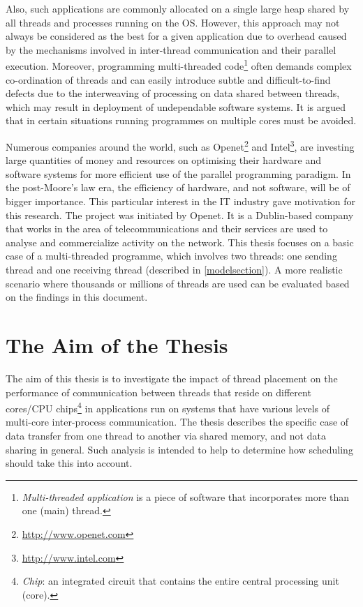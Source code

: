Also, such applications are commonly allocated on a single large heap shared by all threads and processes running on the OS. However, this approach may not always be considered as the best for a given application due to overhead caused by the mechanisms involved in inter-thread communication and their parallel execution. Moreover, programming multi-threaded code\footnote{\textit{Multi-threaded application} is a piece of software that incorporates more than one (main) thread.} often demands complex co-ordination of threads and can easily introduce subtle and difficult-to-find defects due to the interweaving of processing on data shared between threads, which may result in deployment of undependable software systems. It is argued that in certain situations running programmes on multiple cores must be avoided.

Numerous companies around the world, such as Openet\footnote{\url{http://www.openet.com}} and Intel\footnote{\url{http://www.intel.com}}, are investing large quantities of money and resources on optimising their hardware and software systems for more efficient use of the parallel programming paradigm. In the post-Moore's law era, the efficiency of hardware, and not software, will be of bigger importance. This particular interest in the IT industry gave motivation for this research. The project was initiated by Openet. It is a Dublin-based company that works in the area of telecommunications and their services are used to analyse and commercialize activity on the network. This thesis focuses on a basic case of a multi-threaded programme, which involves two threads: one sending thread and one receiving thread (described in \ref{modelsection}). A more realistic scenario where thousands or millions of threads are used can be evaluated based on the findings in this document.

\section{The Aim of the Thesis}
\label{final_aim}

The aim of this thesis is to investigate the impact of thread placement on the performance of communication between threads that reside on different cores/CPU chips\footnote{\textit{Chip}: an integrated circuit that contains the entire central processing unit (core)\cite{FreeOnlineDictionary2014}.} in applications run on systems that have various levels of multi-core inter-process communication. The thesis describes the specific case of data transfer from one thread to another via shared memory, and not data sharing in general. Such analysis is intended to help to determine how scheduling should take this into account.

